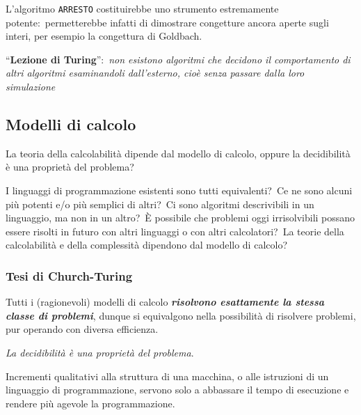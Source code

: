 L'algoritmo \texttt{ARRESTO} costituirebbe uno strumento estremamente potente:\ permetterebbe infatti di dimostrare congetture ancora aperte sugli interi, per esempio la congettura di Goldbach.\

\vspace{12pt}
\noindent``\textbf{Lezione di Turing}'':\ \textit{non esistono algoritmi che decidono il comportamento di altri algoritmi esaminandoli dall'esterno, cioè senza passare dalla loro simulazione}

\subsection{Modelli di calcolo}

La teoria della calcolabilità dipende dal modello di calcolo, oppure la decidibilità è una proprietà del problema?

I linguaggi di programmazione esistenti sono tutti equivalenti?\
Ce ne sono alcuni più potenti e/o più semplici di altri?\
Ci sono algoritmi descrivibili in un linguaggio, ma non in un altro?\
È possibile che problemi oggi irrisolvibili possano essere risolti in futuro con altri linguaggi o con altri calcolatori?\
La teorie della calcolabilità e della complessità dipendono dal modello di calcolo?

\subsubsection{Tesi di Church-Turing}

Tutti i (ragionevoli) modelli di calcolo \textbf{\textit{risolvono esattamente la stessa classe di problemi}}, dunque si equivalgono nella possibilità di risolvere problemi, pur operando con diversa efficienza.\

\begin{center}
    \textit{La decidibilità è una proprietà del problema}.\
\end{center}
Incrementi qualitativi alla struttura di una macchina, o alle istruzioni di un linguaggio di programmazione, servono solo a abbassare il tempo di esecuzione e rendere più agevole la programmazione.\
